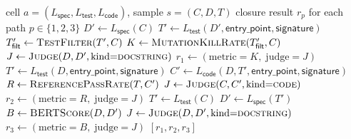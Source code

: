\begin{algorithm}[htbp]
\caption{Round-trip closure path execution.}
\label{alg:path_execution}
\begin{algorithmic}[1]
\Require cell $a = (L_{\textsf{spec}}, L_{\textsf{test}}, L_{\textsf{code}})$, sample $s = (C, D, T)$
\Ensure closure result $r_p$ for each path $p \in \{1, 2, 3\}$
   
    \State $D' \gets L_{\textsf{spec}}(C)$
    \State $T' \gets L_{\textsf{test}}(D', \textsf{entry\_point}, \textsf{signature})$
    \State $T'_{\textsf{filt}} \gets \textsc{TestFilter}(T', C)$ 
    \State $K \gets \textsc{MutationKillRate}(T'_{\textsf{filt}}, C)$
    \State $J \gets \textsc{Judge}(D, D', \text{kind}{=}\textsc{docstring})$
    \State $r_1 \gets (\text{metric}{=}K,\; \text{judge}{=}J)$
   
    \State $T' \gets L_{\textsf{test}}(D, \textsf{entry\_point}, \textsf{signature})$
    \State $C' \gets L_{\textsf{code}}(D, T', \textsf{entry\_point}, \textsf{signature})$
    \State $R \gets \textsc{ReferencePassRate}(T, C')$
    \State $J \gets \textsc{Judge}(C, C', \text{kind}{=}\textsc{code})$
    \State $r_2 \gets (\text{metric}{=}R,\; \text{judge}{=}J)$
  \Else {}
    \State $T' \gets L_{\textsf{test}}(C)$
    \State $D' \gets L_{\textsf{spec}}(T')$
    \State $B \gets \textsc{BERTScore}(D, D')$
    \State $J \gets \textsc{Judge}(D, D', \text{kind}{=}\textsc{docstring})$
    \State $r_3 \gets (\text{metric}{=}B,\; \text{judge}{=}J)$
  \EndIf
\EndFor
\State \Return $[r_1, r_2, r_3]$
\end{algorithmic}
\end{algorithm}


